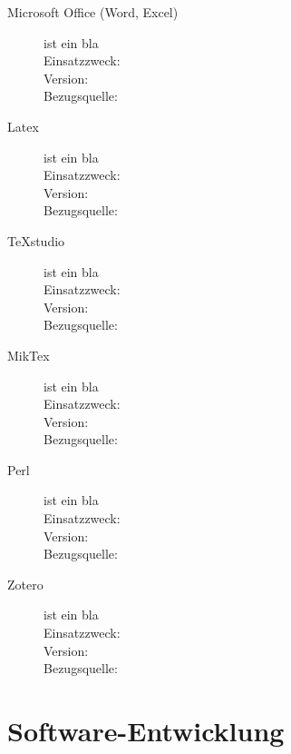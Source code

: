 \begin{description}
	\item [Microsoft Office (Word, Excel)] ist ein bla \\
	Einsatzzweck: \\
	Version: \\
	Bezugsquelle: \\
	
	
	\item [Latex] ist ein bla \\
	Einsatzzweck: \\
	Version: \\
	Bezugsquelle: \\
	
	
	\item [TeXstudio] ist ein bla \\
	Einsatzzweck: \\
	Version: \\
	Bezugsquelle: \\
	
	
	\item [MikTex] ist ein bla \\
	Einsatzzweck: \\
	Version: \\
	Bezugsquelle: \\
	
	
	\item [Perl] ist ein bla \\
	Einsatzzweck: \\
	Version: \\
	Bezugsquelle: \\
	
	
	\item [Zotero] ist ein bla \\
	Einsatzzweck: \\
	Version: \\
	Bezugsquelle: \\
\end{description}



\section{Software-Entwicklung}

